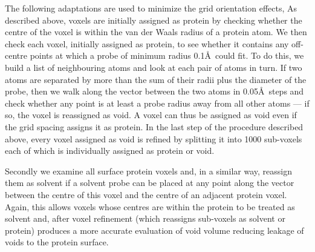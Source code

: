 \documentclass{article}
\begin{document}
The following adaptations are used to minimize the grid orientation
effects, As described above, voxels are initially assigned as protein
by checking whether the centre of the voxel is within the van der
Waals radius of a protein atom.  We then check each voxel, initially
assigned as protein, to see whether it contains any off-centre points
at which a probe of minimum radius 0.1\AA\ could fit. To do this, we
build a list of neighbouring atoms and look at each pair of atoms in
turn. If two atoms are separated by more than the sum of their radii
plus the diameter of the probe, then we walk along the vector between
the two atoms in 0.05\AA\ steps and check whether any point is at
least a probe radius away from all other atoms --- if so, the voxel is
reassigned as void. A voxel can thus be assigned as void even if the
grid spacing assigns it as protein.  In the last step of the procedure
described above, every voxel assigned as void is refined by splitting
it into 1000 sub-voxels each of which is individually assigned as
protein or void.

Secondly we examine all surface protein voxels and, in a similar way,
reassign them as solvent if a solvent probe can be placed at any point
along the vector between the centre of this voxel and the centre of an
adjacent protein voxel. Again, this allows voxels whose centres are
within the protein to be treated as solvent and, after voxel
refinement (which reassigns sub-voxels as solvent or protein) produces
a more accurate evaluation of void volume reducing leakage of voids to
the protein surface.




\end{document}
